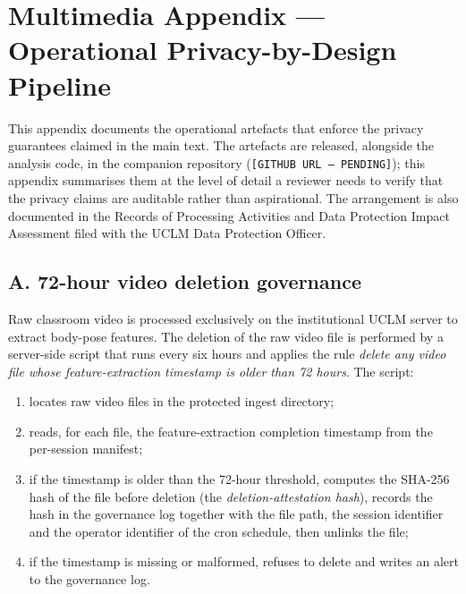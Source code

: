 
\section*{Multimedia Appendix --- Operational Privacy-by-Design Pipeline}\label{sec:appendix-privacy}

This appendix documents the operational artefacts that enforce the privacy guarantees claimed in the main text. The artefacts are released, alongside the analysis code, in the companion repository (\texttt{[GITHUB URL --- PENDING]}); this appendix summarises them at the level of detail a reviewer needs to verify that the privacy claims are auditable rather than aspirational. The arrangement is also documented in the Records of Processing Activities and Data Protection Impact Assessment filed with the UCLM Data Protection Officer.

\subsection*{A. 72-hour video deletion governance}

Raw classroom video is processed exclusively on the institutional UCLM server to extract body-pose features. The deletion of the raw video file is performed by a server-side script that runs every six hours and applies the rule \emph{delete any video file whose feature-extraction timestamp is older than 72 hours}. The script:

\begin{enumerate}[label=A.\arabic*., leftmargin=*, itemsep=2pt]
  \item locates raw video files in the protected ingest directory;
  \item reads, for each file, the feature-extraction completion timestamp from the per-session manifest;
  \item if the timestamp is older than the 72-hour threshold, computes the SHA-256 hash of the file before deletion (the \emph{deletion-attestation hash}), records the hash in the governance log together with the file path, the session identifier and the operator identifier of the cron schedule, then unlinks the file;
  \item if the timestamp is missing or malformed, refuses to delete and writes an alert to the governance log.
\end{enumerate}

